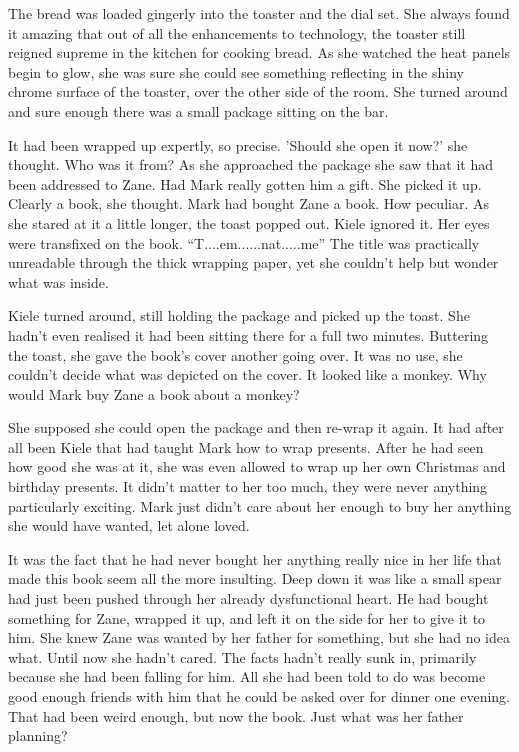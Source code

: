 The bread was loaded gingerly into the toaster and the dial set.  She always found it amazing that out of all the enhancements to technology, the toaster still reigned supreme in the kitchen for cooking bread.  As she watched the heat panels begin to glow, she was sure she could see something reflecting in the shiny chrome surface of the toaster, over the other side of the room.  She turned around and sure enough there was a small package sitting on the bar.  

It had been wrapped up expertly, so precise.  'Should she open it now?' she thought.  Who was it from?  As she approached the package she saw that it had been addressed to Zane.  Had Mark really gotten him a gift.  She picked it up.  Clearly a book, she thought.  Mark had bought Zane a book.  How peculiar.  As she stared at it a little longer, the toast popped out.  Kiele ignored it.  Her eyes were transfixed on the book.  ``T....em......nat.....me''  The title was practically unreadable through the thick wrapping paper, yet she couldn't help but wonder what was inside.

Kiele turned around, still holding the package and picked up the toast.  She hadn't even realised it had been sitting there for a full two minutes.  Buttering the toast, she gave the book's cover another going over.  It was no use, she couldn't decide what was depicted on the cover.  It looked like a monkey.  Why would Mark buy Zane a book about a monkey?

She supposed she could open the package and then re-wrap it again.  It had after all been Kiele that had taught Mark how to wrap presents.  After he had seen how good she was at it, she was even allowed to wrap up her own Christmas and birthday presents.  It didn't matter to her too much, they were never anything particularly exciting.  Mark just didn't care about her enough to buy her anything she would have wanted, let alone loved.

It was the fact that he had never bought her anything really nice in her life that made this book seem all the more insulting.  Deep down it was like a small spear had just been pushed through her already dysfunctional heart.  He had bought something for Zane, wrapped it up, and left it on the side for her to give it to him.  She knew Zane was wanted by her father for something, but she had no idea what.  Until now she hadn't cared.  The facts hadn't really sunk in, primarily because she had been falling for him.  All she had been told to do was become good enough friends with him that he could be asked over for dinner one evening.  That had been weird enough, but now the book.  Just what was her father planning?

